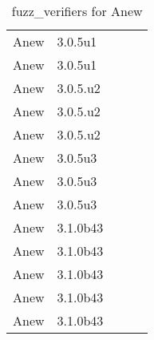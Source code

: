 \begin{table}[htbp]
\begin{tabular}{@{}llccc@{}}
Anew	&	3.0.5u1	&	\passmark	&	\failmark	&	\failmark\\
Anew	&	3.0.5u1	&	\passmark	&	\failmark	&	\failmark\\
Anew	&	3.0.5.u2	&	\passmark	&	\failmark	&	\failmark\\
Anew	&	3.0.5.u2	&	\passmark	&	\failmark	&	\failmark\\
Anew	&	3.0.5.u2	&	\passmark	&	\failmark	&	\failmark\\
Anew	&	3.0.5u3	&	\passmark	&	\failmark	&	\failmark\\
Anew	&	3.0.5u3	&	\passmark	&	\failmark	&	\failmark\\
Anew	&	3.0.5u3	&	\passmark	&	\failmark	&	\failmark\\
Anew	&	3.1.0b43	&	\passmark	&	\failmark	&	\failmark\\
Anew	&	3.1.0b43	&	\passmark	&	\failmark	&	\failmark\\
Anew	&	3.1.0b43	&	\passmark	&	\failmark	&	\failmark\\
Anew	&	3.1.0b43	&	\passmark	&	\failmark	&	\failmark\\
Anew	&	3.1.0b43	&	\passmark	&	\failmark	&	\failmark\\
\bottomrule
\end{tabular}
\caption{fuzz_verifiers for Anew}
\end{table}